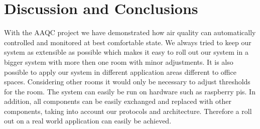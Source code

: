 \section{Discussion and Conclusions}\label{sec:discussion-and-conclusions}


With the AAQC project we have demonstrated how air quality can automatically controlled and monitored at best comfortable state.
We always tried to keep our system as extensible as possible which makes it easy to roll out our system in a bigger system with more then one room with minor adjustments.
It is also possible to apply our system in different application areas different to office spaces.
Considering other rooms it would only be necessary to adjust thresholds for the room.
The system can easily be run on hardware such as raspberry pis.
In addition, all components can be easily exchanged and replaced with other components, taking into account our
protocols and architecture.
Therefore a roll out on a real world application can easily be achieved.